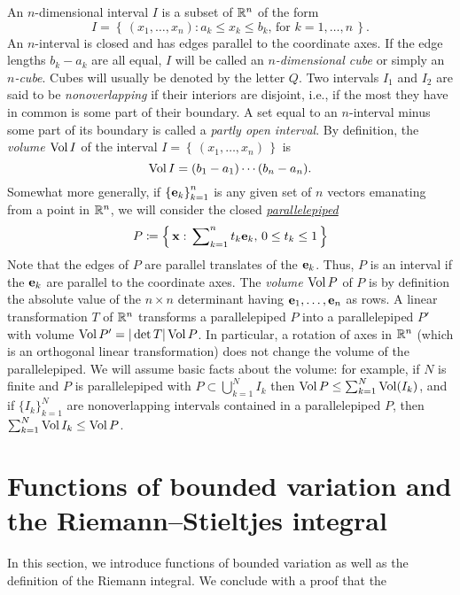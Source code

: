 An $n$-dimensional interval $I$ is a subset of $\mathbb{R}^n$ of the form
\begin{equation}
\label{eq:1:n-interval}
I=\left\{\,(x_1,\dotsc,x_n):\text{$a_k\leq x_k\leq b_k$, for $k=1,\dotsc,n$}\,\right\}.
\end{equation}
An $n$-interval is closed and has edges parallel to the coordinate axes. If
the edge lengths $b_k-a_k$ are all equal, $I$ will be called an
\emph{$n$-dimensional cube} or simply an \emph{$n$-cube}. Cubes will
usually be denoted by the letter $Q$. Two intervals $I_1$ and $I_2$ are
said to be \emph{nonoverlapping} if their interiors are disjoint, i.e., if
the most they have in common is some part of their boundary. A set equal to
an $n$-interval minus some part of its boundary is called a \emph{partly
  open interval}. By definition, the \emph{volume $\operatorname{Vol} I$} of the interval
$I=\left\{\,(x_1,\dotsc,x_n)\,\right\}$ is
\begin{equation}
  \label{eq:1:volume-of-n-interval}
\operatorname{Vol} I=(b_1-a_1)\dotsm(b_n-a_n).
\end{equation}
Somewhat more generally, if ${\{\mathbf{e}_k\}}_{k=1}^n$ is any given set of $n$
vectors emanating from a point in $\mathbb{R}^n$, we will consider the closed
\href{https://en.wikipedia.org/wiki/Parallelepiped}{\emph{parallelepiped}}
\begin{equation}
  \label{eq:1:parallelepiped}
P\coloneqq\left\{\,\mathbf{x}:\text{$\sideset{}{_{k=1}^n}\sum t_k\mathbf{e}_k$, $0\leq
    t_k\leq 1$}\,\right\}
\end{equation}
Note that the edges of $P$ are parallel translates of the $\mathbf{e}_k$. Thus,
$P$ is an interval if the $\mathbf{e}_k$ are parallel to the coordinate axes. The
\emph{volume $\operatorname{Vol} P$} of $P$ is by definition the absolute value of the
$n\times n$ determinant having $\mathbf{e}_1,\dotsc,\mathbf{e}_n$ as rows. A linear
transformation $T$ of $\mathbb{R}^n$ transforms a parallelepiped $P$ into a
parallelepiped $P'$ with volume $\operatorname{Vol} P'=|\det T|\operatorname{Vol} P$. In particular, a
rotation of axes in $\mathbb{R}^n$ (which is an orthogonal linear transformation)
does not change the volume of the parallelepiped. We will assume basic
facts about the volume: for example, if $N$ is finite and $P$ is
parallelepiped with $P\subset\bigcup_{k=1}^N I_k$ then $\operatorname{Vol}
P\leq\sum_{k=1}^N\operatorname{Vol}(I_k)$, and if ${\{I_k\}}_{k=1}^N$ are nonoverlapping
intervals contained in a parallelepiped $P$, then $\sum_{k=1}^N\operatorname{Vol}
I_k\leq\operatorname{Vol} P$.

\section{Functions of bounded variation and the Riemann--Stieltjes
  integral}
In this section, we introduce functions of bounded variation as well as the
definition of the Riemann integral. We conclude with a proof that the

